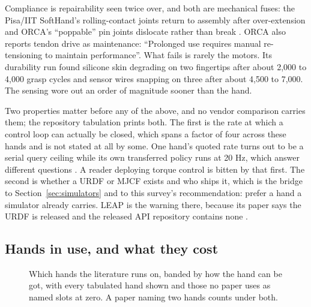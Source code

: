 Compliance is repairability seen twice over, and both are mechanical fuses: the Pisa/IIT
SoftHand's rolling-contact joints return to assembly after over-extension and ORCA's ``poppable''
pin joints dislocate rather than break \cite{pisa_iit_softhand_2014,orca_hand_2025}. ORCA also
reports tendon drive as maintenance: ``Prolonged use requires manual re-tensioning to maintain
performance''. What fails is rarely the motors. Its durability run found silicone skin degrading
on two fingertips after about 2,000 to 4,000 grasp cycles and sensor wires snapping on three after
about 4,500 to 7,000. The sensing wore out an order of magnitude sooner than the hand.

Two properties matter before any of the above, and no vendor comparison carries them; the
repository tabulation prints both. The first is the rate at which a control loop can actually be
closed, which spans a factor of four across these hands and is not stated at all by some. One
hand's quoted rate turns out to be a serial query ceiling while its own transferred policy runs at
20 Hz, which answer different questions \cite{leap_hand_2023}. A reader deploying torque control
is bitten by that first. The second is whether a URDF or MJCF exists and who ships it, which is
the bridge to Section~\ref{sec:simulators} and to this survey's recommendation: prefer a hand a
simulator already carries. LEAP is the warning there, because its paper says the URDF is released
and the released API repository contains none \cite{leap_hand_2023}.


\subsection{Hands in use, and what they cost}
\label{sec:hands:used}

\begin{figure}[!t]
  \centering
  \resizebox{\columnwidth}{!}{}
  \caption{Which hands the literature runs on, banded by how the hand can be got, with every tabulated hand shown and those no paper uses as named slots at zero. A paper naming two hands counts under both.}
  \label{fig:hands}
\end{figure}

